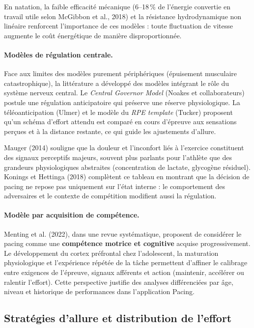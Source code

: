\documentclass[11pt,a4paper]{article}
\begin{document}
En natation, la faible efficacité mécanique (6--18\,\% de l'énergie convertie en travail utile selon McGibbon et al., 2018) et la résistance hydrodynamique non linéaire renforcent l'importance de ces modèles : toute fluctuation de vitesse augmente le coût énergétique de manière disproportionnée.

\paragraph{Modèles de régulation centrale.}
Face aux limites des modèles purement périphériques (épuisement musculaire catastrophique), la littérature a développé des modèles intégrant le rôle du système nerveux central. Le \textit{Central Governor Model} (Noakes et collaborateurs) postule une régulation anticipatoire qui préserve une réserve physiologique. La téléoanticipation (Ulmer) et le modèle du \textit{RPE template} (Tucker) proposent qu'un schéma d'effort attendu est comparé en cours d'épreuve aux sensations perçues et à la distance restante, ce qui guide les ajustements d'allure.

Mauger (2014) souligne que la douleur et l'inconfort liés à l'exercice constituent des signaux perceptifs majeurs, souvent plus parlants pour l'athlète que des grandeurs physiologiques abstraites (concentration de lactate, glycogène résiduel). Konings et Hettinga (2018) complètent ce tableau en montrant que la décision de pacing ne repose pas uniquement sur l'état interne : le comportement des adversaires et le contexte de compétition modifient aussi la régulation.

\paragraph{Modèle par acquisition de compétence.}
Menting et al. (2022), dans une revue systématique, proposent de considérer le pacing comme une \textbf{compétence motrice et cognitive} acquise progressivement. Le développement du cortex préfrontal chez l'adolescent, la maturation physiologique et l'expérience répétée de la tâche permettent d'affiner le calibrage entre exigences de l'épreuve, signaux afférents et action (maintenir, accélérer ou ralentir l'effort). Cette perspective justifie des analyses différenciées par âge, niveau et historique de performances dans l'application Pacing.

\subsection{Stratégies d'allure et distribution de l'effort}
\end{document}
